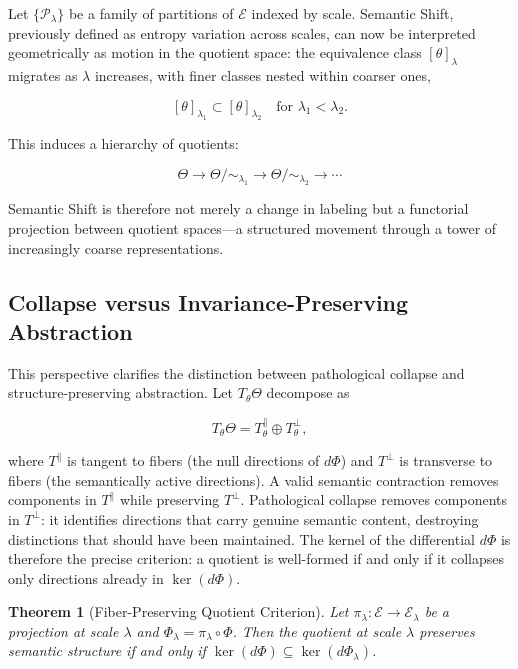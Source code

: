 \documentclass[11pt, twoside]{article}
\theoremstyle{plain}
\newtheorem{theorem}{Theorem}[section]
\theoremstyle{definition}
\theoremstyle{remark}
\begin{document}
Let $\{\mathcal{P}_\lambda\}$ be a family of partitions of $\mathcal{E}$ indexed by scale. Semantic Shift, previously defined as entropy variation across scales, can now be interpreted geometrically as motion in the quotient space: the equivalence class $[\theta]_\lambda$ migrates as $\lambda$ increases, with finer classes nested within coarser ones,

\[
[\theta]_{\lambda_1} \subset [\theta]_{\lambda_2} \quad \text{for } \lambda_1 < \lambda_2.
\]

This induces a hierarchy of quotients:

\[
\Theta \to \Theta / {\sim_{\lambda_1}} \to \Theta / {\sim_{\lambda_2}} \to \cdots
\]

Semantic Shift is therefore not merely a change in labeling but a functorial projection between quotient spaces---a structured movement through a tower of increasingly coarse representations.

\subsection{Collapse versus Invariance-Preserving Abstraction}

This perspective clarifies the distinction between pathological collapse and structure-preserving abstraction. Let $T_\theta \Theta$ decompose as

\[
T_\theta \Theta = T_\theta^{\parallel} \oplus T_\theta^{\perp},
\]

where $T^{\parallel}$ is tangent to fibers (the null directions of $d\Phi$) and $T^{\perp}$ is transverse to fibers (the semantically active directions). A valid semantic contraction removes components in $T^{\parallel}$ while preserving $T^{\perp}$. Pathological collapse removes components in $T^{\perp}$: it identifies directions that carry genuine semantic content, destroying distinctions that should have been maintained. The kernel of the differential $d\Phi$ is therefore the precise criterion: a quotient is well-formed if and only if it collapses only directions already in $\ker(d\Phi)$.

\begin{theorem}[Fiber-Preserving Quotient Criterion]
Let $\pi_\lambda : \mathcal{E} \to \mathcal{E}_\lambda$ be a projection at scale $\lambda$ and $\Phi_\lambda = \pi_\lambda \circ \Phi$. Then the quotient at scale $\lambda$ preserves semantic structure if and only if $\ker(d\Phi) \subseteq \ker(d\Phi_\lambda)$.
\end{theorem}
\end{document}
